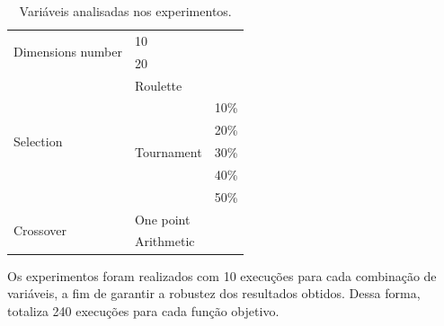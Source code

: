 \begin{table}[!ht]
    \center%
    \begin{tabular}{|l|l|l|}
        \bottomrule
        \multirow{2}{*}{Dimensions number} & \multicolumn{2}{l|}{10}                                 \\ \cline{2-3}
                                           & \multicolumn{2}{l|}{20}                                 \\ \hline
        \multirow{6}{*}{Selection}         & \multicolumn{2}{l|}{Roulette}                           \\ \cline{2-3}
                                           & \multicolumn{1}{l|}{\multirow{5}{*}{Tournament}} & 10\% \\ \cline{3-3}
                                           & \multicolumn{1}{l|}{}                            & 20\% \\ \cline{3-3}
                                           & \multicolumn{1}{l|}{}                            & 30\% \\ \cline{3-3}
                                           & \multicolumn{1}{l|}{}                            & 40\% \\ \cline{3-3}
                                           & \multicolumn{1}{l|}{}                            & 50\% \\ \hline
        \multirow{2}{*}{Crossover}         & \multicolumn{2}{l|}{One point}                          \\ \cline{2-3}
                                           & \multicolumn{2}{l|}{Arithmetic}                         \\ \toprule
    \end{tabular}
    \caption{Variáveis analisadas nos experimentos.}%
    \label{tab:variaveis}
\end{table}

Os experimentos foram realizados com 10 execuções para cada combinação de variáveis, a fim de garantir a robustez dos resultados obtidos.
Dessa forma, totaliza 240 execuções para cada função objetivo.
